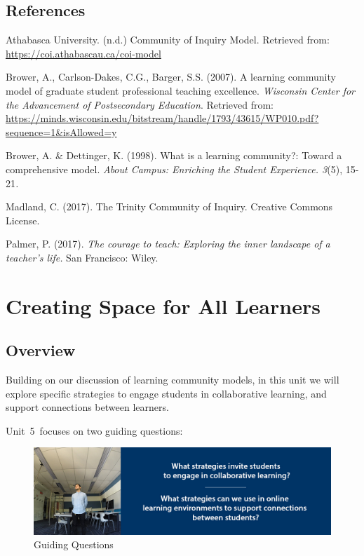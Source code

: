 \documentclass[
]{book}
\begin{document}
\hypertarget{references-1}{%
\section*{References}\label{references-1}}

Athabasca University. (n.d.) Community of Inquiry Model. Retrieved from: \url{https://coi.athabascau.ca/coi-model}

Brower, A., Carlson-Dakes, C.G., Barger, S.S. (2007). A learning community model of graduate student professional teaching excellence. \emph{Wisconsin Center for the Advancement of Postsecondary Education}. Retrieved from: \url{https://minds.wisconsin.edu/bitstream/handle/1793/43615/WP010.pdf?sequence=1\&isAllowed=y}

Brower, A. \& Dettinger, K. (1998). What is a learning community?: Toward a comprehensive model. \emph{About Campus: Enriching the Student Experience. 3}(5), 15-21\emph{. }

Madland, C. (2017). The Trinity Community of Inquiry. Creative Commons License.

Palmer, P. (2017). \emph{The courage to teach: Exploring the inner landscape of a teacher's life.} San Francisco: Wiley.

\hypertarget{creating-space-for-all-learners}{%
\chapter{Creating Space for All Learners}\label{creating-space-for-all-learners}}

\hypertarget{overview-4}{%
\section*{Overview}\label{overview-4}}

Building on our discussion of learning community models, in this unit we will explore specific strategies to engage students in collaborative learning, and support connections between learners.

Unit~5~focuses on two guiding questions:

\begin{figure}
\centering
\includegraphics{assets/unit5/LDRS664-BannerUnit5.jpg}
\caption{Guiding Questions}
\end{figure}
\end{document}
